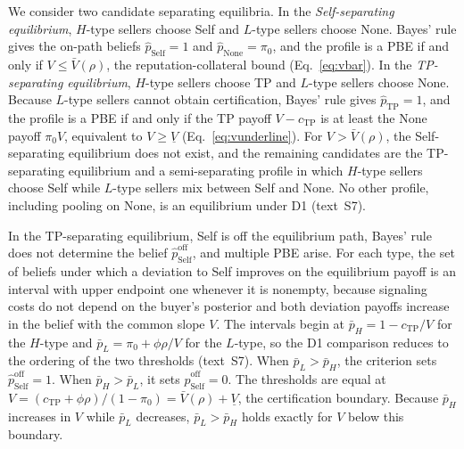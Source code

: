 \documentclass[11pt,letterpaper]{article}
\theoremstyle{definition}
\begin{document}
We consider two candidate separating equilibria. In the \textit{Self-separating equilibrium}, $H$-type sellers choose Self and $L$-type sellers choose None. Bayes' rule gives the on-path beliefs $\hat{p}_{\text{Self}} = 1$ and $\hat{p}_{\text{None}} = \pi_0$, and the profile is a PBE if and only if $V \leq \bar{V}(\rho)$, the reputation-collateral bound (Eq.~\ref{eq:vbar}). In the \textit{TP-separating equilibrium}, $H$-type sellers choose TP and $L$-type sellers choose None. Because $L$-type sellers cannot obtain certification, Bayes' rule gives $\hat{p}_{\text{TP}} = 1$, and the profile is a PBE if and only if the TP payoff $V - c_{\text{TP}}$ is at least the None payoff $\pi_0 V$, equivalent to $V \geq \underline{V}$ (Eq.~\ref{eq:vunderline}). For $V > \bar{V}(\rho)$, the Self-separating equilibrium does not exist, and the remaining candidates are the TP-separating equilibrium and a semi-separating profile in which $H$-type sellers choose Self while $L$-type sellers mix between Self and None. No other profile, including pooling on None, is an equilibrium under D1 (text~S7).

In the TP-separating equilibrium, Self is off the equilibrium path, Bayes' rule does not determine the belief $\hat{p}_{\text{Self}}^{\text{off}}$, and multiple PBE arise. For each type, the set of beliefs under which a deviation to Self improves on the equilibrium payoff is an interval with upper endpoint one whenever it is nonempty, because signaling costs do not depend on the buyer's posterior and both deviation payoffs increase in the belief with the common slope $V$. The intervals begin at $\bar{p}_H = 1 - c_{\text{TP}}/V$ for the $H$-type and $\bar{p}_L = \pi_0 + \phi\rho/V$ for the $L$-type, so the D1 comparison reduces to the ordering of the two thresholds (text~S7). When $\bar{p}_L > \bar{p}_H$, the criterion sets $\hat{p}_{\text{Self}}^{\text{off}} = 1$. When $\bar{p}_H > \bar{p}_L$, it sets $\hat{p}_{\text{Self}}^{\text{off}} = 0$. The thresholds are equal at $V = (c_{\text{TP}} + \phi\rho)/(1 - \pi_0) = \bar{V}(\rho) + \underline{V}$, the certification boundary. Because $\bar{p}_H$ increases in $V$ while $\bar{p}_L$ decreases, $\bar{p}_L > \bar{p}_H$ holds exactly for $V$ below this boundary.
\end{document}
